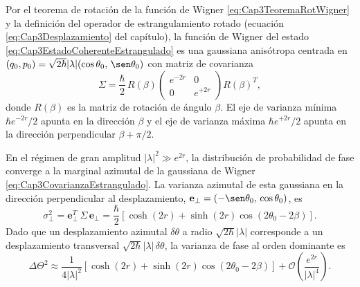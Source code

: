                 Por el teorema de rotación de la función de Wigner \ref{eq:Cap3TeoremaRotWigner} y la definición del operador de estrangulamiento rotado (ecuación \ref{eq:Cap3Desplazamiento} del capítulo), la función de Wigner del estado \ref{eq:Cap3EstadoCoherenteEstrangulado} es una gaussiana anisótropa centrada en $(q_0,p_0)=\sqrt{2\hbar}|\lambda|(\cos\theta_0,\,\sen\theta_0)$ con matriz de covarianza
                \begin{equation}\label{eq:Cap3CovarianzaEstrangulado}
                    \Sigma = \frac{\hbar}{2}\,R(\beta)\begin{pmatrix}e^{-2r} & 0 \\ 0 & e^{+2r}\end{pmatrix}R(\beta)^T,
                \end{equation}
                donde $R(\beta)$ es la matriz de rotación de ángulo $\beta$. El eje de varianza mínima $\hbar e^{-2r}/2$ apunta en la dirección $\beta$ y el eje de varianza máxima $\hbar e^{+2r}/2$ apunta en la dirección perpendicular $\beta + \pi/2$.

                En el régimen de gran amplitud $|\lambda|^2\gg e^{2r}$, la distribución de probabilidad de fase converge a la marginal azimutal de la gaussiana de Wigner \ref{eq:Cap3CovarianzaEstrangulado}. La varianza azimutal de esta gaussiana en la dirección perpendicular al desplazamiento, $\mathbf{e}_\perp = (-\sen\theta_0,\,\cos\theta_0)$, es
                \begin{equation}
                    \sigma_\perp^2 = \mathbf{e}_\perp^T\,\Sigma\,\mathbf{e}_\perp = \frac{\hbar}{2}\left[\cosh(2r) + \sinh(2r)\cos(2\theta_0 - 2\beta)\right].
                \end{equation}
                Dado que un desplazamiento azimutal $\delta\theta$ a radio $\sqrt{2\hbar}|\lambda|$ corresponde a un desplazamiento transversal $\sqrt{2\hbar}|\lambda|\,\delta\theta$, la varianza de fase al orden dominante es
                \begin{equation}\label{eq:Cap3VarianzaEstrangulado}
                    \Delta\Theta^2 \approx \frac{1}{4|\lambda|^2}\left[\cosh(2r)+\sinh(2r)\cos(2\theta_0-2\beta)\right]+\mathcal{O}\!\left(\frac{e^{2r}}{|\lambda|^4}\right).
                \end{equation}

